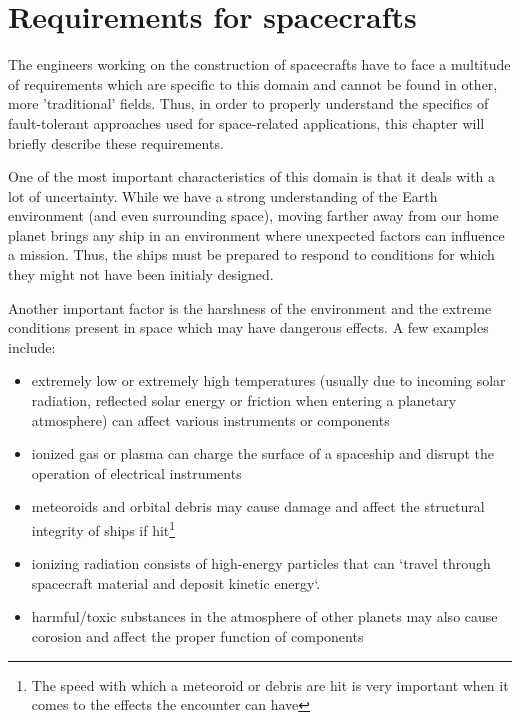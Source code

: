\section{Requirements for spacecrafts}
The engineers working on the construction of spacecrafts have to face a
multitude of requirements which are specific to this domain and cannot be found
in other, more 'traditional' fields. Thus, in order to properly understand the
specifics of fault-tolerant approaches used for space-related applications, this
chapter will briefly describe these requirements.

One of the most important characteristics of this domain is that it deals with a
lot of uncertainty. While we have a strong understanding of the Earth
environment (and even surrounding space), moving farther away from our home
planet brings any ship in an environment where unexpected factors can influence
a mission. Thus, the ships must be prepared to respond to conditions for which
they might not have been initialy designed.

Another important factor is the harshness of the environment and the extreme
conditions present in space which may have dangerous effects. A few examples
include\cite{req-space-environment}:
\begin{itemize}
  \item extremely low or extremely high temperatures (usually due to incoming
  solar radiation, reflected solar energy or friction when entering a planetary
  atmosphere) can affect various instruments or components
  \item ionized gas or plasma can charge the surface of a spaceship and
  disrupt the operation of electrical instruments
  \item meteoroids and orbital debris may cause damage and affect the structural
  integrity of ships if hit\footnote{The speed with which a meteoroid or debris
  are hit is very important when it comes to the effects the encounter can have}
  \item ionizing radiation consists of high-energy particles that can `travel
  through spacecraft material and deposit kinetic energy`.
  \item harmful/toxic substances in the atmosphere of other planets may also
  cause corosion and affect the proper function of components
\end{itemize}

